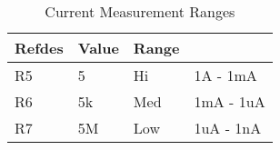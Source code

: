 \begin{table}[h]
\begin{tabular}{|l|l|l|l|}
\hline
Refdes & Value & Range &           \\ \hline
R5     & 5     & Hi    & 1A  - 1mA \\ \hline
R6     & 5k    & Med   & 1mA - 1uA \\ \hline
R7     & 5M    & Low   & 1uA - 1nA \\ \hline
\end{tabular}
\caption{Current Measurement Ranges}
\label{imeas_table}
\end{table}
